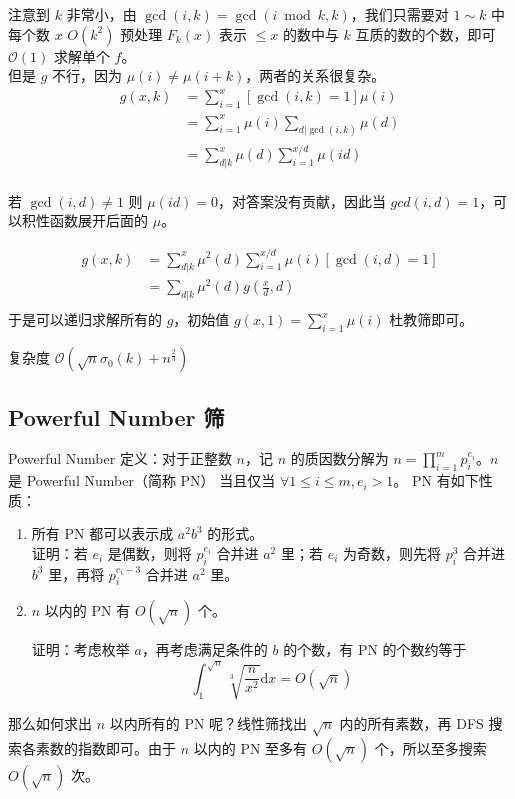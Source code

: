 \documentclass[UTF8]{beamer}
\begin{document}
    \begin{frame}
        注意到 $k$ 非常小，由 $\gcd(i,k)=\gcd(i\bmod k,k)$，我们只需要对 $1\sim k$ 中每个数 $x$ $O(k^2)$ 预处理 $F_k(x)$ 表示 $\le x$ 的数中与 $k$ 互质的数的个数，即可 $\mathcal O(1)$ 求解单个 $f$。\\
        \pause
        但是 $g$ 不行，因为 $\mu(i)\not=\mu(i+k)$，两者的关系很复杂。
    $$
    \begin{aligned}
    g(x,k)&=\sum_{i=1}^{x}[\gcd(i,k)=1]\mu(i)\\
    &=\sum_{i=1}^{x}\mu(i)\sum_{d|\gcd(i,k)}\mu(d)\\
    &=\sum_{d|k}^{x}\mu(d)\sum_{i=1}^{x/d}\mu(id)\\
    \end{aligned}
    $$
    \end{frame}
    \begin{frame}
    
    若 $\gcd(i,d)\not=1$ 则 $\mu(id)=0$，对答案没有贡献，因此当 $gcd(i,d)=1$，可以积性函数展开后面的 $\mu$。
    
    $$
    \begin{aligned}
    g(x,k)&=\sum_{d|k}^{x}\mu^2(d)\sum_{i=1}^{x/d}\mu(i)[\gcd(i,d)=1]\\
    &=\sum_{d|k}\mu^2(d)g\left(\frac{x}{d},d\right)\\
    \end{aligned}
    $$
    于是可以递归求解所有的 $g$，初始值 $g(x,1)=\sum_{i=1}^{x}\mu(i)$ 杜教筛即可。
    
    复杂度 $\mathcal O(\sqrt{n}\sigma_0(k)+n^{\frac{2}{3}})$
    \end{frame}

    \subsection{Powerful Number 筛}
    \begin{frame}{Powerful Number}
        定义：对于正整数 $n$，记 $n$ 的质因数分解为 
$n = \prod_{i=1}^{m} p_{i}^{e_{i}}$。$n$ 是 Powerful Number（简称 PN） 当且仅当 $\forall 1 \le i \le m, e_{i} > 1$。
\pause
PN 有如下性质：
\begin{enumerate}
    \item 所有 PN 都可以表示成 $a^{2}b^{3}$ 的形式。\\
    证明：若 $e_i$ 是偶数，则将 
$p_{i}^{e_{i}}$ 合并进 $a^{2}$ 里；若 $e_i$ 为奇数，则先将 $p_{i}^{3}$ 合并进 $b^{3}$ 里，再将 $p_{i}^{e_{i}-3}$ 合并进 $a^{2}$ 里。\\
    \item $n$ 以内的 PN 有 $O(\sqrt{n})$ 个。

    证明：考虑枚举 $a$，再考虑满足条件的 $b$ 的个数，有 PN 的个数约等于
    $$
    \int_{1}^{\sqrt{n}} \sqrt[3]{\frac{n}{x^2}} \mathrm{d}x = O(\sqrt{n})
    $$
    
\end{enumerate}
\pause
那么如何求出 $n$ 以内所有的 PN 呢？线性筛找出 $\sqrt{n}$ 内的所有素数，再 DFS 搜索各素数的指数即可。由于 $n$ 以内的 PN 至多有 $O(\sqrt{n})$ 个，所以至多搜索 $O(\sqrt{n})$ 次。
    \end{frame}
\end{document}
